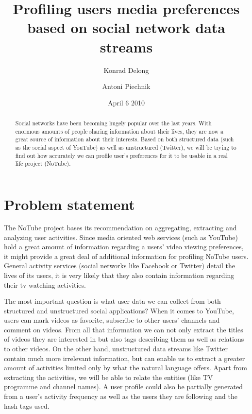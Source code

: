 \documentclass{article}
\begin{document}
\title{Profiling users media preferences based on social network data streams}
\author{Konrad Delong \and Antoni Piechnik}
\date{April 6 2010}

\maketitle

\begin{abstract}
Social networks have been becoming hugely popular over the last years. With enormous amounts of people sharing information about their lives, they are now a great source of information about their interests. Based on both structured data (such as the social aspect of YouTube) as well as unstructured (Twitter), we will be trying to find out how accurately we can profile user's preferences for it to be usable in a real life project (NoTube).
\end{abstract}

\section{Problem statement}
The NoTube project bases its recommendation on aggregating, extracting and analyzing user activities. Since media oriented web services (such as YouTube) hold a great amount of information regarding a users' video viewing preferences, it might provide a great deal of additional information for profiling NoTube users. General activity services (social networks like Facebook or Twitter) detail the lives of its users, it is very likely that they also contain information regarding their tv watching activities.

The most important question is what user data we can collect from both structured and unstructured social applications? When it comes to YouTube, users can mark videos as favorite, subscribe to other users' channels and comment on videos. From all that information we can not only extract the titles of videos they are interested in but also tags describing them as well as relations to other videos. On the other hand, unstructured data streams like Twitter contain much more irrelevant information, but can enable us to extract a greater amount of activities limited only by what the natural language offers. Apart from extracting the activities, we will be able to relate the entities (like TV programme and channel names). A user profile could also be partially generated from a user's activity frequency as well as the users they are following and the hash tags used.
\end{document}
